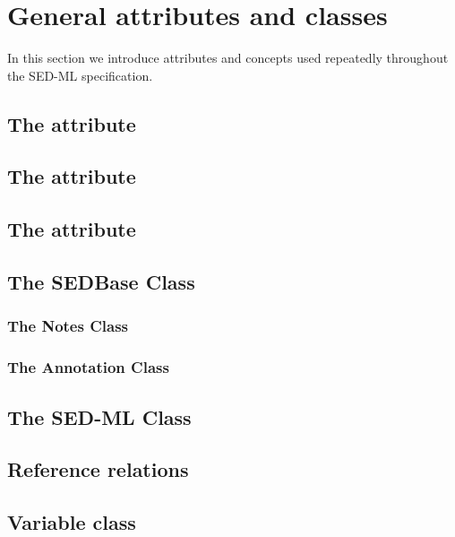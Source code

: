 \section{General attributes and classes}
In this section we introduce attributes and concepts used repeatedly throughout the SED-ML specification. 

\subsection{The  attribute}


\subsection{The   attribute}


\subsection{The  attribute}

\newpage
\subsection{The SEDBase Class}


\subsubsection{The Notes Class}


\subsubsection{The Annotation Class}


\newpage
\subsection{The SED-ML Class}


\newpage
\subsection{Reference relations}


\newpage
\subsection{Variable class}


